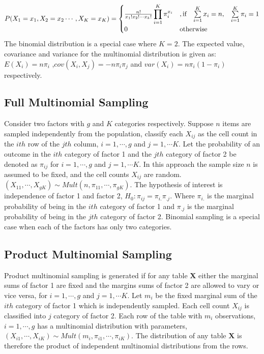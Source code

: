 \documentclass[12pt,oneside]{report}
\theoremstyle{definition}
\theoremstyle{mystyle}
\begin{document}
 \[ P(X_{1}=x_{1},X_{2}=x_{2}\cdots,X_{K}=x_{K})=\begin{cases}
\frac{n !}{x_{1}!x_{2}!\cdots x_{k}!} \displaystyle \prod\limits_{i=1}^{K}\pi^{x_{i}}_{i} & ,\mbox{if} \hspace{3mm}\sum\limits_{i=1}^{K}x_{i} =n, \hspace{3mm}\sum\limits_{i=1}^{K}\pi_{i}=1\\
0 & \mbox{otherwise} \\
\end{cases}
\]
The binomial distribution is a special case where $K=2$. The expected value, covariance and variance for the multinomial distribution is given as:
$E(X_{i})=n\pi_{i}$ ,$cov(X_{i},X_{j})	=-n\pi_{i}\pi_{j}$ and $var(X_{i})=n\pi_{i}(1-\pi_{i})$ respectively.

\subsection{Full Multinomial Sampling}
Consider two factors  with $g$ and $K$ categories respectively. Suppose $n$ items are sampled independently from  the population, classify each $X_{ij}$ as the cell count in the $ith$ row of the $jth$ column, $i=1,\cdots,g$ and $j=1,\cdots K$. Let  the  probability of an outcome in the $ith$ category of factor 1 and the $jth$ category of factor 2 be denoted as  $\pi_{ij}$ for $i=1,\cdots,g$ and $j=1,\cdots K$. In this approach the sample size $n$ is assumed to be fixed, and the cell counts $X_{ij}$ are random.\\
$(X_{11},\cdots,X_{gK}) \sim Mult(n,\pi_{11},\cdots,\pi_{gK})$.
The hypothesis of interest is independence of factor 1 and factor 2, $H_{0}:\pi_{ij}=\pi_{i.}\pi_{.j}$. Where $\pi_{i.}$ is the marginal probability of being in the $ith$ category of factor 1 and $\pi_{.j}$ is the marginal probability of being in the $jth$ category of factor 2. Binomial sampling is a special case when each of the factors has only two categories.
\subsection{Product Multinomial Sampling}
Product multinomial sampling is generated if for any table $\textbf{X}$ either the marginal sums  of factor 1 are fixed and the margins sums of factor 2 are allowed to vary or vice versa, for $i=1,\cdots,g$ and $j=1,\cdots K$. Let  $m_{i}$ be the fixed marginal sum of the $ith$ category of factor 1  which is independently sampled. Each  cell count  $X_{ij}$ is classified into  $j$ category of factor 2. Each row of the table with $m_{i}$ observations, $i=1,\cdots,g$ has a multinomial distribution with parameters, $(X_{i1},\cdots,X_{iK}) \sim Mult(m_{i},\pi_{i1},\cdots,\pi_{iK})$. The distribution of any table $\textbf{X}$ is therefore the product of independent multinomial distributions from the rows.\\
\end{document}
